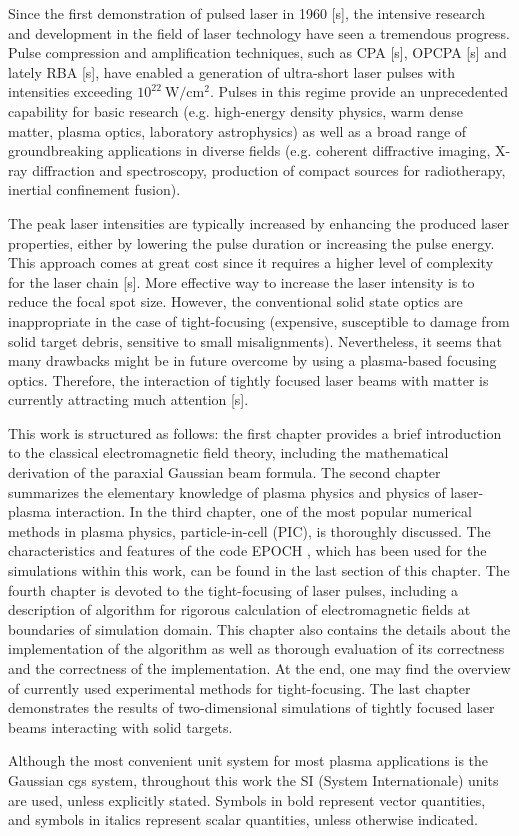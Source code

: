 Since the first demonstration of pulsed laser in 1960 [s], the intensive research and development in the field of laser technology have seen a tremendous progress. Pulse compression and amplification techniques, such as CPA [s], OPCPA [s] and lately RBA [s], have enabled a generation of ultra-short laser pulses with intensities exceeding $ 10^{22} \ \mathrm{W/cm^{2}} $. Pulses in this regime provide an unprecedented capability for basic research (e.g. high-energy density physics, warm dense matter, plasma optics, laboratory astrophysics) as well as a broad range of groundbreaking applications in diverse fields (e.g. coherent diffractive imaging, X-ray diffraction and spectroscopy, production of compact sources for radiotherapy, inertial confinement fusion).

The peak laser intensities are typically increased by enhancing the produced laser properties, either by lowering the pulse duration or increasing the pulse energy. This approach comes at great cost since it requires a higher level of complexity for the laser chain [s]. More effective way to increase the laser intensity is to reduce the focal spot size. However, the conventional solid state optics are inappropriate in the case of tight-focusing (expensive, susceptible to damage from solid target debris, sensitive to small misalignments). Nevertheless, it seems that many drawbacks might be in future overcome by using a plasma-based focusing optics. Therefore, the interaction of tightly focused laser beams with matter is currently attracting much attention [s]. 

This work is structured as follows: the first chapter provides a brief introduction to the classical electromagnetic field theory, including the mathematical derivation of the paraxial Gaussian beam formula. The second chapter summarizes the elementary knowledge of plasma physics and physics of laser-plasma interaction. In the third chapter, one of the most popular numerical methods in plasma physics, particle-in-cell (PIC), is thoroughly discussed. The characteristics and features of the code EPOCH \cite{bennett}, which has been used for the simulations within this work, can be found in the last section of this chapter. The fourth chapter is devoted to the tight-focusing of laser pulses, including a description of algorithm for rigorous calculation of electromagnetic fields at boundaries of simulation domain. This chapter also contains the details about the implementation of the algorithm as well as thorough evaluation of its correctness and the correctness of the implementation. At the end, one may find the overview of currently used experimental methods for tight-focusing. The last chapter demonstrates the results of two-dimensional simulations of tightly focused laser beams interacting with solid targets.

Although the most convenient unit system for most plasma applications is the Gaussian cgs system, throughout this work the SI (System Internationale) units are used, unless explicitly stated. Symbols in bold represent vector quantities, and symbols in italics represent scalar quantities, unless otherwise indicated.
